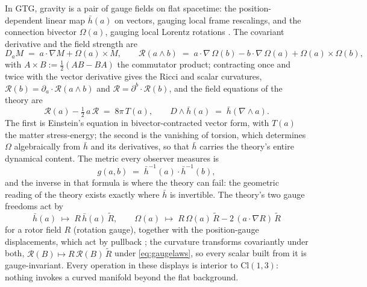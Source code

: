 \documentclass[11pt]{article}
\theoremstyle{definition}
\newcommand{\Cl}{\mathrm{Cl}}
\newcommand{\hb}{\bar{h}}
\begin{document}
In GTG, gravity is a pair of gauge fields on flat spacetime: the position-dependent linear map $\hb(a)$ on vectors, gauging local frame rescalings, and the connection bivector $\Omega(a)$, gauging local Lorentz rotations \cite{LDG1998}. The covariant derivative and the field strength are
\begin{equation}\label{eq:gtgdyn}
D_a M \;=\; a\cdot\nabla M + \Omega(a) \times M, \qquad
\mathcal{R}(a \wedge b) \;=\; a\cdot\nabla\,\Omega(b) - b\cdot\nabla\,\Omega(a) + \Omega(a) \times \Omega(b),
\end{equation}
with $A \times B := \tfrac12(AB - BA)$ the commutator product; contracting once and twice with the vector derivative gives the Ricci and scalar curvatures, $\mathcal{R}(b) = \partial_a \cdot \mathcal{R}(a \wedge b)$ and $\mathcal{R} = \partial^b \cdot \mathcal{R}(b)$, and the field equations of the theory are
\begin{equation}\label{eq:gtgfield}
\mathcal{R}(a) - \tfrac12\, a\, \mathcal{R} \;=\; 8\pi\, T(a), \qquad
D \wedge \hb(a) \;=\; \hb(\nabla \wedge a) .
\end{equation}
The first is Einstein's equation in bivector-contracted vector form, with $T(a)$ the matter stress-energy; the second is the vanishing of torsion, which determines $\Omega$ algebraically from $\hb$ and its derivatives, so that $\hb$ carries the theory's entire dynamical content. The metric every observer measures is
\begin{equation}\label{eq:metricdef}
g(a,b) \;=\; \hb^{-1}(a) \cdot \hb^{-1}(b),
\end{equation}
and the inverse in that formula is where the theory can fail: the geometric reading of the theory exists exactly where $\hb$ is invertible. The theory's two gauge freedoms act by
\begin{equation}\label{eq:gaugelaws}
\hb(a) \;\mapsto\; R\,\hb(a)\,\tilde R, \qquad
\Omega(a) \;\mapsto\; R\,\Omega(a)\,\tilde R - 2\,(a\cdot\nabla R)\,\tilde R
\end{equation}
for a rotor field $R$ (rotation gauge), together with the position-gauge displacements, which act by pullback \cite{LDG1998}; the curvature transforms covariantly under both, $\mathcal{R}(B) \mapsto R\,\mathcal{R}(B)\,\tilde R$ under \eqref{eq:gaugelaws}, so every scalar built from it is gauge-invariant. Every operation in these displays is interior to $\Cl(1,3)$: nothing invokes a curved manifold beyond the flat background.
\end{document}
